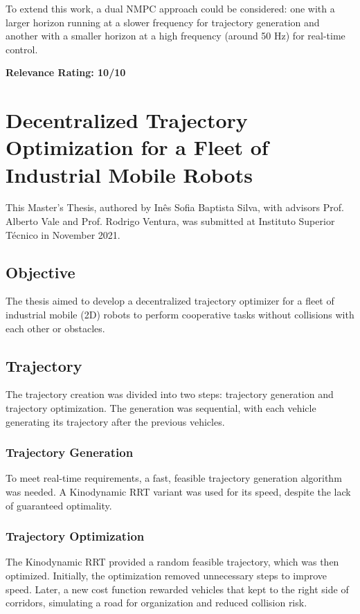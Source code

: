 \documentclass[a4paper,12pt]{article}
\begin{document}
To extend this work, a dual NMPC approach could be considered: one with a
larger horizon running at a slower frequency for trajectory generation and
another with a smaller horizon at a high frequency (around 50 Hz) for real-time
control.

\textbf{Relevance Rating: 10/10}

\section{Decentralized Trajectory Optimization for a Fleet of Industrial Mobile Robots}\label{sec:Ines_Silva_Thesis_Decentralized_Trajectory_Optimization}
This Master's Thesis, authored by Inês Sofia Baptista Silva, with advisors
Prof. Alberto Vale and Prof. Rodrigo Ventura, was submitted at Instituto
Superior Técnico in November 2021.

\subsection{Objective}
The thesis aimed to develop a decentralized trajectory optimizer for a fleet of
industrial mobile (2D) robots to perform cooperative tasks without collisions
with each other or obstacles.

\subsection{Trajectory}
The trajectory creation was divided into two steps: trajectory generation and
trajectory optimization. The generation was sequential, with each vehicle
generating its trajectory after the previous vehicles.

\subsubsection{Trajectory Generation}
To meet real-time requirements, a fast, feasible trajectory generation
algorithm was needed. A Kinodynamic RRT variant was used for its speed, despite
the lack of guaranteed optimality.

\subsubsection{Trajectory Optimization}
The Kinodynamic RRT provided a random feasible trajectory, which was then
optimized. Initially, the optimization removed unnecessary steps to improve
speed. Later, a new cost function rewarded vehicles that kept to the right side
of corridors, simulating a road for organization and reduced collision risk.
\end{document}
